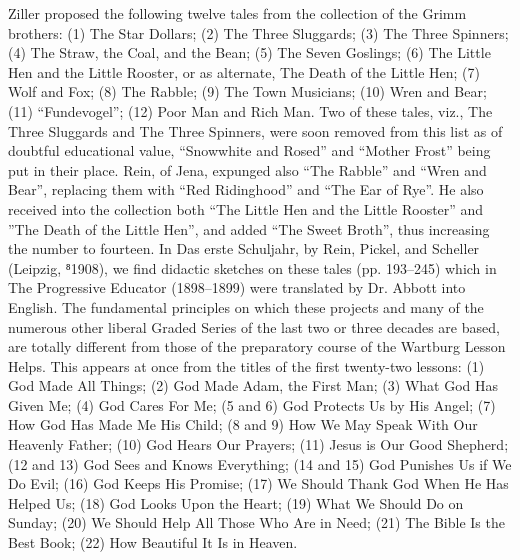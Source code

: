 Ziller proposed the following twelve tales from the collection of the Grimm brothers: (1) The Star Dollars; (2) The Three Sluggards; (3) The Three Spinners; (4) The Straw, the Coal, and the Bean; (5) The Seven Goslings; (6) The Little Hen and the Little Rooster, or as alternate, The Death of the Little Hen; (7) Wolf and Fox; (8) The Rabble; (9) The Town Musicians; (10) Wren and Bear; (11) “Fundevogel”; (12) Poor Man and Rich Man. Two of these tales, viz., The Three Sluggards and The Three Spinners, were soon removed from this list as of doubtful educational value, “Snowwhite and Rosed” and “Mother Frost” being put in their place. Rein, of Jena, expunged also “The Rabble” and “Wren and Bear”, replacing them with “Red Ridinghood” and “The Ear of Rye”. He also received into the collection both “The Little Hen and the Little Rooster” and ”The Death of the Little Hen”, and added “The Sweet Broth”, thus increasing the number to fourteen. In Das erste Schuljahr, by Rein, Pickel, and Scheller (Leipzig, ⁸1908), we find didactic sketches on these tales (pp. 193–245) which in The Progressive Educator (1898–1899) were translated by Dr. Abbott into English. The fundamental principles on which these projects and many of the numerous other liberal Graded Series of the last two or three decades are based, are totally different from those of the preparatory course of the Wartburg Lesson Helps. This appears at once from the titles of the first twenty-two lessons: (1) God Made All Things; (2) God Made Adam, the First Man; (3) What God Has Given Me; (4) God Cares For Me; (5 and 6)
God Protects Us by His Angel; (7) How God Has Made Me His Child; (8 and 9) How We May Speak With Our Heavenly Father; (10) God Hears Our Prayers; (11) Jesus is Our Good Shepherd; (12 and 13) God Sees and Knows Everything; (14 and 15) God Punishes Us if We Do Evil; (16) God Keeps His Promise; (17) We Should Thank God When He Has Helped Us; (18) God Looks Upon the Heart; (19) What We Should Do on Sunday; (20) We Should Help All Those Who Are in Need; (21) The Bible Is the Best Book; (22) How Beautiful It Is in Heaven.

